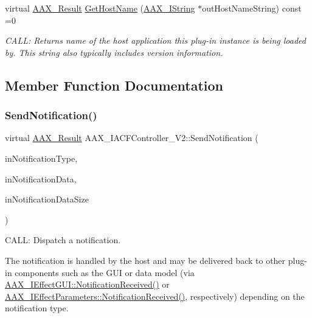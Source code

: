 \begin{DoxyCompactItemize}
virtual \mbox{\hyperlink{a00392_a4d8f69a697df7f70c3a8e9b8ee130d2f}{A\+A\+X\+\_\+\+Result}} \mbox{\hyperlink{a01641_aeac17aa11caa18994fb891109681d0d6}{Get\+Host\+Name}} (\mbox{\hyperlink{a01873}{A\+A\+X\+\_\+\+I\+String}} $\ast$out\+Host\+Name\+String) const =0
\begin{DoxyCompactList}\small\item\em C\+A\+LL\+: Returns name of the host application this plug-\/in instance is being loaded by. This string also typically includes version information. \end{DoxyCompactList}\end{DoxyCompactItemize}


\subsection{Member Function Documentation}
\mbox{\label{a01641_a83640488e70f990fcfeeeb400b80776b}} 
\subsubsection{\texorpdfstring{SendNotification()}{SendNotification()}}
{\footnotesize\ttfamily virtual \mbox{\hyperlink{a00392_a4d8f69a697df7f70c3a8e9b8ee130d2f}{A\+A\+X\+\_\+\+Result}} A\+A\+X\+\_\+\+I\+A\+C\+F\+Controller\+\_\+\+V2\+::\+Send\+Notification (\begin{DoxyParamCaption}\item[{\mbox{\hyperlink{a00392_ac678f9c1fbcc26315d209f71a147a175}{A\+A\+X\+\_\+\+C\+Type\+ID}}}]{in\+Notification\+Type,  }\item[{const void $\ast$}]{in\+Notification\+Data,  }\item[{uint32\+\_\+t}]{in\+Notification\+Data\+Size }\end{DoxyParamCaption})\hspace{0.3cm}{\ttfamily [pure virtual]}}



C\+A\+LL\+: Dispatch a notification. 

The notification is handled by the host and may be delivered back to other plug-\/in components such as the G\+UI or data model (via \mbox{\hyperlink{a01665_a11a15162cb3c7019d1fabf2994fba6c6}{A\+A\+X\+\_\+\+I\+Effect\+G\+U\+I\+::\+Notification\+Received()}} or \mbox{\hyperlink{a01669_aa3eaeb292d2ca84086a5a058171994fd}{A\+A\+X\+\_\+\+I\+Effect\+Parameters\+::\+Notification\+Received()}}, respectively) depending on the notification type.

